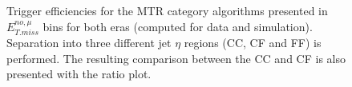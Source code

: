 \begin{figure}[htbp]
{    }
  \caption{Trigger efficiencies for the MTR category algorithms presented in $E_{T.miss}^{no,\mu}$ bins for both eras (computed for data and simulation). Separation into three different jet $\eta$ regions (CC, CF and FF) is performed. The resulting comparison between the CC and CF is also presented with the ratio plot. }
  \label{fig:metmht_test}
\end{figure}


